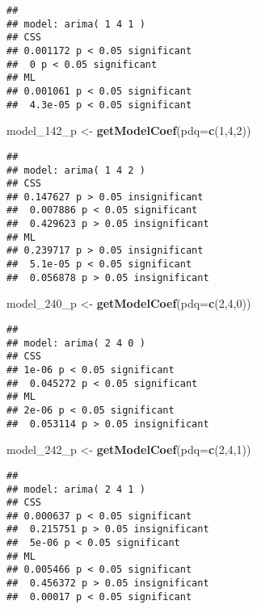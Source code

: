 \documentclass[]{article}
\newenvironment{Shaded}{\begin{snugshade}}{\end{snugshade}}
\newcommand{\DataTypeTok}[1]{\textcolor[rgb]{0.13,0.29,0.53}{#1}}
\newcommand{\DecValTok}[1]{\textcolor[rgb]{0.00,0.00,0.81}{#1}}
\newcommand{\KeywordTok}[1]{\textcolor[rgb]{0.13,0.29,0.53}{\textbf{#1}}}
\newcommand{\NormalTok}[1]{#1}
\newcommand{\StringTok}[1]{\textcolor[rgb]{0.31,0.60,0.02}{#1}}
\begin{document}
\begin{verbatim}
## 
## model: arima( 1 4 1 )
## CSS 
## 0.001172 p < 0.05 significant 
##  0 p < 0.05 significant 
## ML 
## 0.001061 p < 0.05 significant 
##  4.3e-05 p < 0.05 significant
\end{verbatim}

\begin{Shaded}
\begin{Highlighting}[]
\NormalTok{model_}\DecValTok{142}\NormalTok{_p <-}\StringTok{ }\KeywordTok{getModelCoef}\NormalTok{(}\DataTypeTok{pdq=}\KeywordTok{c}\NormalTok{(}\DecValTok{1}\NormalTok{,}\DecValTok{4}\NormalTok{,}\DecValTok{2}\NormalTok{))}
\end{Highlighting}
\end{Shaded}

\begin{verbatim}
## 
## model: arima( 1 4 2 )
## CSS 
## 0.147627 p > 0.05 insignificant 
##  0.007886 p < 0.05 significant 
##  0.429623 p > 0.05 insignificant 
## ML 
## 0.239717 p > 0.05 insignificant 
##  5.1e-05 p < 0.05 significant 
##  0.056878 p > 0.05 insignificant
\end{verbatim}

\begin{Shaded}
\begin{Highlighting}[]
\NormalTok{model_}\DecValTok{240}\NormalTok{_p <-}\StringTok{ }\KeywordTok{getModelCoef}\NormalTok{(}\DataTypeTok{pdq=}\KeywordTok{c}\NormalTok{(}\DecValTok{2}\NormalTok{,}\DecValTok{4}\NormalTok{,}\DecValTok{0}\NormalTok{))}
\end{Highlighting}
\end{Shaded}

\begin{verbatim}
## 
## model: arima( 2 4 0 )
## CSS 
## 1e-06 p < 0.05 significant 
##  0.045272 p < 0.05 significant 
## ML 
## 2e-06 p < 0.05 significant 
##  0.053114 p > 0.05 insignificant
\end{verbatim}

\begin{Shaded}
\begin{Highlighting}[]
\NormalTok{model_}\DecValTok{242}\NormalTok{_p <-}\StringTok{ }\KeywordTok{getModelCoef}\NormalTok{(}\DataTypeTok{pdq=}\KeywordTok{c}\NormalTok{(}\DecValTok{2}\NormalTok{,}\DecValTok{4}\NormalTok{,}\DecValTok{1}\NormalTok{))}
\end{Highlighting}
\end{Shaded}

\begin{verbatim}
## 
## model: arima( 2 4 1 )
## CSS 
## 0.000637 p < 0.05 significant 
##  0.215751 p > 0.05 insignificant 
##  5e-06 p < 0.05 significant 
## ML 
## 0.005466 p < 0.05 significant 
##  0.456372 p > 0.05 insignificant 
##  0.00017 p < 0.05 significant
\end{verbatim}
\end{document}
